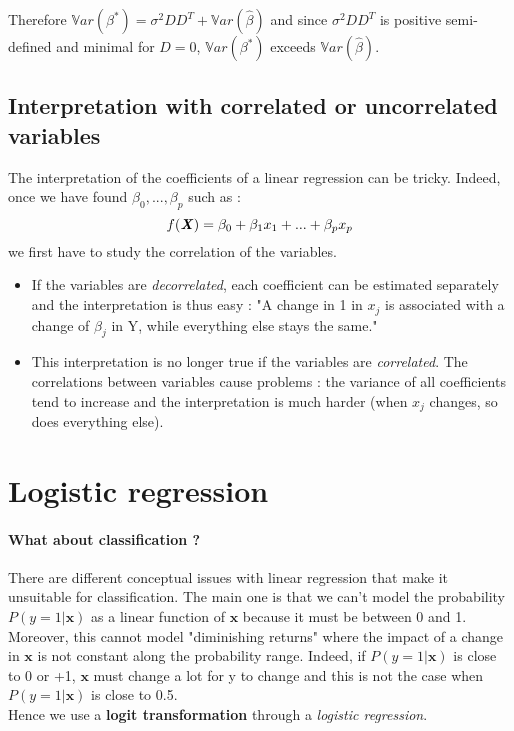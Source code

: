 \documentclass[a4paper,12pt]{article}
\newcommand{\xx}{{\bm x}}
\begin{document}
Therefore \(\mathbb{V}ar(\beta^*) = \sigma^2 D D^T +  \mathbb{V}ar(\hat{\beta})\) and since \(\sigma^2 D D^T \) is positive semi-defined and minimal for \(D = 0\),  \(\mathbb{V}ar(\beta^*)\) exceeds \(\mathbb{V}ar(\hat{\beta})\).  


\subsection{Interpretation with correlated or uncorrelated variables}

The interpretation of the coefficients of a linear regression can be tricky. Indeed, once we have found \(\beta_0,...,\beta_p\) such as : 
\[f(\textbf{\textit{X}}) = \beta_0 + \beta_1 x_1 + ... + \beta_p x_p\]
we first have to study the correlation of the variables. 
\begin{itemize}
\item If the variables are \textit{decorrelated}, each coefficient can be estimated separately and the interpretation is thus easy : "A change in 1 in \(x_j\) is associated with a change of \(\beta_j\) in Y, while everything else stays the same."
\end{itemize}
\begin{itemize}
\item This interpretation is no longer true if the variables are \textit{correlated}. The correlations between variables cause problems : the variance of all coefficients tend to increase and the interpretation is much harder (when \(x_j\) changes, so does everything else). 
\end{itemize}

\section{Logistic regression}

\paragraph{What about classification ?} 
There are different conceptual issues with linear regression that make it unsuitable for classification. The main one is that we can't model the probability \(P(y=1|\xx)\) as a linear function of $\xx$ because it must be between 0 and 1. Moreover, this cannot model "diminishing returns" where the impact of a change in $\xx$ is not constant along the probability range. Indeed, if \(P(y=1|\xx)\) is close to 0 or +1, $\xx$ must change a lot for y to change and this is not the case when \(P(y=1|\xx)\) is close to 0.5. \\
Hence we use a \textbf{logit transformation} through a \textit{logistic regression}.\\
\end{document}
